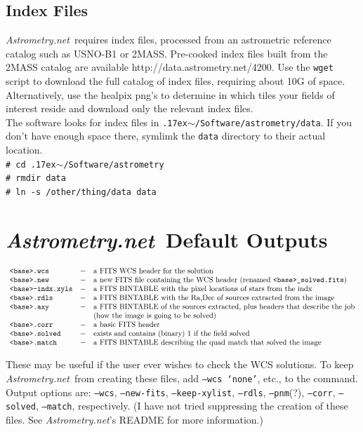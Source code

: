 \documentclass{article}
\newcommand{\ttsim}{\raise.17ex\hbox{$\scriptstyle\mathtt{\sim}$}}
\newcommand{\shellcmd}[1]{\indent\indent\texttt{\small\# #1}\\}
\newcommand{\An}{\textit{Astrometry.net}}
\begin{document}
\subsection{Index Files}
\An~requires index files, processed from an astrometric reference
catalog such as USNO-B1 or 2MASS. Pre-cooked index files built from the 
2MASS catalog are available 
{http://data.astrometry.net/4200}. Use the \texttt{wget} script to download
the full catalog of index files, requiring about 10G of space. Alternatively, 
use the healpix png's to determine in which tiles your fields of interest
reside and download only the relevant index files. \\

\noindent The software looks for index files in 
\texttt{\ttsim/Software/astrometry/data}. If you don't have enough space
there, symlimk the \texttt{data} directory to their actual location. \\
\shellcmd{cd \ttsim/Software/astrometry}
\shellcmd{rmdir data}
\shellcmd{ln -s /other/thing/data data}

\section{\An~Default Outputs}\label{Anoutputs}
\[ \begin{array}{lcl}
\mbox{\texttt{<base>.wcs}} & - & \mbox{a FITS WCS header for the solution} \\
\mbox{\texttt{<base>.new}} & - & \mbox{a new FITS file containing the WCS header (renamed \texttt{<base>\_solved.fits})} \\
\mbox{\texttt{<base>-indx.xyls}} & - & \mbox{a FITS BINTABLE with the pixel locations of stars from the indx} \\
\mbox{\texttt{<base>.rdls}} & - & \mbox{a FITS BINTABLE with the Ra,Dec of sources extracted from the image} \\
\mbox{\texttt{<base>.axy}} & - & \mbox{a FITS BINTABLE of the sources extracted, plus headers that describe the job} \\
\mbox{} & & \mbox{(how the image is going to be solved)} \\
\mbox{\texttt{<base>.corr}} & - & \mbox{a basic FITS header} \\
\mbox{\texttt{<base>.solved}} & - & \mbox{exists and contains (binary) 1 if the field solved} \\
\mbox{\texttt{<base>.match}} & - & \mbox{a FITS BINTABLE describing the quad match that solved the image}
\end{array}\]

\noindent These may be useful if the user ever wishes to check the WCS
solutions. To keep \An~from creating these files, add \texttt{--wcs `none'},
etc., to the command. Output options are:
\texttt{--wcs}, \texttt{--new-fits}, \texttt{--keep-xylist},
\texttt{--rdls}, \texttt{--pnm}(?), \texttt{--corr},
\texttt{--solved}, \texttt{--match}, respectively. (I have not tried 
suppressing the creation of these files. See \An's README for more 
information.)
\end{document}

